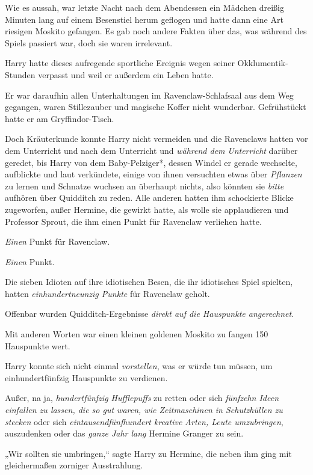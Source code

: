 {Wie es aussah, war letzte Nacht nach dem Abendessen ein Mädchen dreißig Minuten lang auf einem Besenstiel herum geflogen und hatte dann eine Art riesigen Moskito gefangen. Es gab noch andere Fakten über das, was während des Spiels passiert war, doch sie waren irrelevant.

Harry hatte dieses aufregende sportliche Ereignis wegen seiner Okklumentik-Stunden verpasst und weil er außerdem ein Leben hatte.

Er war daraufhin allen Unterhaltungen im Ravenclaw-Schlafsaal aus dem Weg gegangen, waren Stillezauber und magische Koffer nicht wunderbar. Gefrühstückt hatte er am Gryffindor-Tisch.

Doch Kräuterkunde konnte Harry nicht vermeiden und die Ravenclaws hatten vor dem Unterricht und nach dem Unterricht und \emph{während dem} \emph{Unterricht} darüber geredet, bis Harry von dem Baby-Pelziger*, dessen Windel er gerade wechselte, aufblickte und laut verkündete, einige von ihnen versuchten etwas über \emph{Pflanzen} zu lernen und Schnatze wuchsen an überhaupt nichts, also könnten sie \emph{bitte} aufhören über Quidditch zu reden. Alle anderen hatten ihm schockierte Blicke zugeworfen, außer Hermine, die gewirkt hatte, als wolle sie applaudieren und Professor Sprout, die ihm einen Punkt für Ravenclaw verliehen hatte.

\emph{Einen} Punkt für Ravenclaw.

\emph{Einen} Punkt.

Die sieben Idioten auf ihre idiotischen Besen, die ihr idiotisches Spiel spielten, hatten \emph{einhundertneunzig Punkte} für Ravenclaw geholt.

Offenbar wurden Quidditch-Ergebnisse \emph{direkt auf die Hauspunkte angerechnet.}

Mit anderen Worten war einen kleinen goldenen Moskito zu fangen 150 Hauspunkte wert.

Harry konnte sich nicht einmal \emph{vorstellen}, was er würde tun müssen, um einhundertfünfzig Hauspunkte zu verdienen.

Außer, na ja, \emph{hundertfünfzig Hufflepuffs} zu retten oder sich \emph{fünfzehn Ideen einfallen zu lassen, die so gut waren, wie Zeitmaschinen in Schutzhüllen zu stecken} oder sich \emph{eintausendfünfhundert kreative Arten, Leute umzubringen}, auszudenken oder das \emph{ganze Jahr lang} Hermine Granger zu sein.

„Wir sollten sie umbringen,“ sagte Harry zu Hermine, die neben ihm ging mit gleichermaßen zorniger Ausstrahlung.

}
